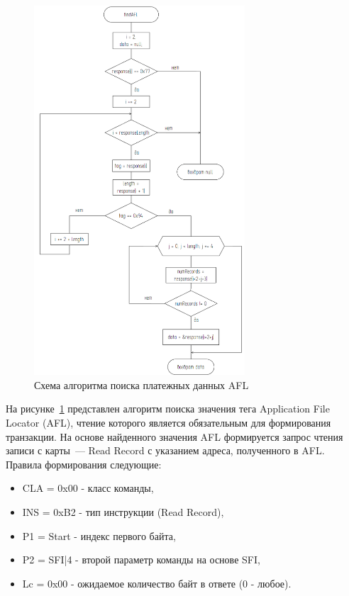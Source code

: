 \begin{figure}[H]
    \centering
    \includegraphics[width=0.7\textwidth]{images/design/find_afl}
    \caption{\centering Схема алгоритма поиска платежных данных AFL}
    \label{fig:find_afl}
\end{figure}


На рисунке~\ref{fig:find_afl} представлен алгоритм поиска значения тега Application File Locator (AFL), чтение которого является обязательным для формирования транзакции.
На основе найденного значения AFL формируется запрос чтения записи с карты~--- Read Record с указанием адреса, полученного в AFL.
Правила формирования следующие:

\begin{itemize}
    \item CLA = 0x00  - класс команды,
    \item INS = 0xB2 - тип инструкции (Read Record),
    \item P1 = Start - индекс первого байта,
    \item P2 = SFI|4 - второй параметр команды на основе SFI,
    \item Lc = 0x00 - ожидаемое количество байт в ответе (0 - любое).
\end{itemize}

